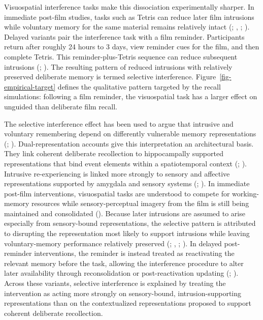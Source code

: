 \documentclass[
  man,
  floatsintext,
  longtable,
  nolmodern,
  notxfonts,
  notimes,
  draftfirst,
  colorlinks=true,linkcolor=blue,citecolor=blue,urlcolor=blue]{apa7}
\begin{document}
Visuospatial interference tasks make this dissociation experimentally
sharper. In immediate post-film studies, tasks such as Tetris can reduce
later film intrusions while voluntary memory for the same material
remains relatively intact (; ,
;
). Delayed variants
pair the interference task with a film reminder. Participants return
after roughly 24 hours to 3 days, view reminder cues for the film, and
then complete Tetris. This reminder-plus-Tetris sequence can reduce
subsequent intrusions (; ).
The resulting pattern of reduced intrusions with relatively preserved
deliberate memory is termed selective interference.
Figure~\ref{fig-empirical-target} defines the qualitative pattern
targeted by the recall simulations: following a film reminder, the
visuospatial task has a larger effect on unguided than deliberate film
recall.

The selective interference effect has been used to argue that intrusive
and voluntary remembering depend on differently vulnerable memory
representations (;
). Dual-representation
accounts give this interpretation an architectural basis. They link
coherent deliberate recollection to hippocampally supported
representations that bind event elements within a spatiotemporal context
(;
). Intrusive
re-experiencing is linked more strongly to sensory and affective
representations supported by amygdala and sensory systems
(;
). In immediate
post-film interventions, visuospatial tasks are understood to compete
for working-memory resources while sensory-perceptual imagery from the
film is still being maintained and consolidated
(). Because
later intrusions are assumed to arise especially from sensory-bound
representations, the selective pattern is attributed to disrupting the
representation most likely to support intrusions while leaving
voluntary-memory performance relatively preserved
(;
,
;
). In delayed
post-reminder interventions, the reminder is instead treated as
reactivating the relevant memory before the task, allowing the
interference procedure to alter later availability through
reconsolidation or post-reactivation updating
(;
). Across these
variants, selective interference is explained by treating the
intervention as acting more strongly on sensory-bound,
intrusion-supporting representations than on the contextualized
representations proposed to support coherent deliberate recollection.
\end{document}
